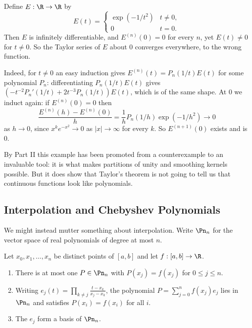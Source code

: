 \begin{example}\label{ex:cauchy}
	Define $E : \R\to\R$ by
	$$E(t) = \begin{cases} \exp(-1/t^2) & t\neq 0,\\ 0 & t=0.\end{cases}$$
	Then $E$ is infinitely differentiable, and $E^{(n)}(0)=0$ for every $n$, yet $E(t)\neq 0$ for $t \neq 0$. So the Taylor series of $E$ about $0$ converges everywhere, to the wrong function.

	Indeed, for $t\neq 0$ an easy induction gives $E^{(n)}(t) = P_n(1/t)E(t)$ for some polynomial $P_n$: differentiating $P_n(1/t)E(t)$ gives $\left(-t^{-2}P_n'(1/t) + 2t^{-3}P_n(1/t)\right)E(t)$, which is of the same shape. At $0$ we induct again: if $E^{(n)}(0)=0$ then
	$$\frac{E^{(n)}(h)-E^{(n)}(0)}{h} = \frac1h P_n(1/h)\exp(-1/h^2) \to 0$$
	as $h\to 0$, since $x^k e^{-x^2}\to 0$ as $|x|\to\infty$ for every $k$. So $E^{(n+1)}(0)$ exists and is $0$.
\end{example}

By Part II this example has been promoted from a counterexample to an invaluable tool: it is what makes partitions of unity and smoothing kernels possible. But it does show that Taylor's theorem is not going to tell us that continuous functions look like polynomials.

\subsection{Interpolation and Chebyshev Polynomials}

We might instead mutter something about interpolation. Write $\Pn_n$ for the vector space of real polynomials of degree at most $n$.

\begin{lemma}\label{lem:lagrange}
	Let $x_0,x_1,\ldots,x_n$ be distinct points of $[a,b]$ and let $f : [a,b] \to\R$.
	\begin{enumerate}[label=(\roman*)]
		\item There is at most one $P \in \Pn_n$ with $P(x_j) = f(x_j)$ for $0\leq j\leq n$.
		\item Writing $e_j(t) = \prod_{k\neq j}\frac{t-x_k}{x_j-x_k}$, the polynomial $P = \sum_{j=0}^n f(x_j)e_j$ lies in $\Pn_n$ and satisfies $P(x_i)=f(x_i)$ for all $i$.
		\item The $e_j$ form a basis of $\Pn_n$.
	\end{enumerate}
\end{lemma}

